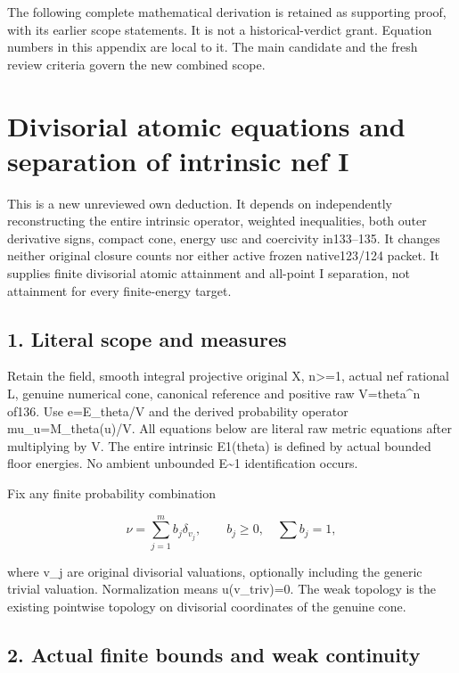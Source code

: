 \documentclass[
  10pt,
]{article}
\begin{document}
The following complete mathematical derivation is retained as supporting
proof, with its earlier scope statements. It is not a historical-verdict
grant. Equation numbers in this appendix are local to it. The main
candidate and the fresh review criteria govern the new combined scope.

\section{Divisorial atomic equations and separation of intrinsic nef
I}\label{divisorial-atomic-equations-and-separation-of-intrinsic-nef-i}

This is a new unreviewed own deduction. It depends on independently
reconstructing the entire intrinsic operator, weighted inequalities,
both outer derivative signs, compact cone, energy usc and coercivity
in133--135. It changes neither original closure counts nor either active
frozen native123/124 packet. It supplies finite divisorial atomic
attainment and all-point I separation, not attainment for every
finite-energy target.

\subsection{1. Literal scope and
measures}\label{literal-scope-and-measures}

Retain the field, smooth integral projective original X,
n\textgreater=1, actual nef rational L, genuine numerical cone,
canonical reference and positive raw V=theta\^{}n of136. Use
e=E\_theta/V and the derived probability operator mu\_u=M\_theta(u)/V.
All equations below are literal raw metric equations after multiplying
by V. The entire intrinsic E1(theta) is defined by actual bounded floor
energies. No ambient unbounded E\textasciitilde1 identification occurs.

Fix any finite probability combination

\[\nu=\sum_{j=1}^m b_j\delta_{v_j},\qquad b_j\geq0,\quad\sum b_j=1,\]

where v\_j are original divisorial valuations, optionally including the
generic trivial valuation. Normalization means u(v\_triv)=0. The weak
topology is the existing pointwise topology on divisorial coordinates of
the genuine cone.

\subsection{2. Actual finite bounds and weak
continuity}\label{actual-finite-bounds-and-weak-continuity}
\end{document}
